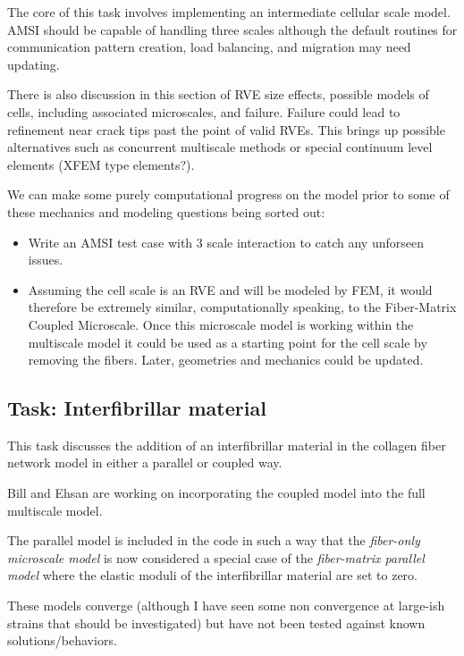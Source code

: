 \documentclass{article}
\begin{document}
The core of this task involves implementing an intermediate cellular scale model. AMSI should be capable of handling three scales although the default routines for communication pattern creation, load balancing, and migration may need updating.

There is also discussion in this section of RVE size effects, possible models of cells, including associated microscales, and failure. Failure could lead to refinement near crack tips past the point of valid RVEs. This brings up possible alternatives such as concurrent multiscale methods or special continuum level elements (XFEM type elements?).

We can make some purely computational progress on the model prior to some of these mechanics and modeling questions being sorted out:

\begin{itemize}
\item Write an AMSI test case with 3 scale interaction to catch any unforseen issues.
\item Assuming the cell scale is an RVE and will be modeled by FEM, it would therefore be extremely similar, computationally speaking, to the Fiber-Matrix Coupled Microscale. Once this microscale model is working within the multiscale model it could be used as a starting point for the cell scale by removing the fibers. Later, geometries and mechanics could be updated.
\end{itemize}

\subsection{Task: Interfibrillar material}

This task discusses the addition of an interfibrillar material in the collagen fiber network model in either a parallel or coupled way.

Bill and Ehsan are working on incorporating the coupled model into the full multiscale model.

The parallel model is included in the code in such a way that the \textit{fiber-only microscale model} is now considered a special case of the \textit{fiber-matrix parallel model} where the elastic moduli of the interfibrillar material are set to zero. 

These models converge (although I have seen some non convergence at large-ish strains that should be investigated) but have not been tested against known solutions/behaviors.
\end{document}
